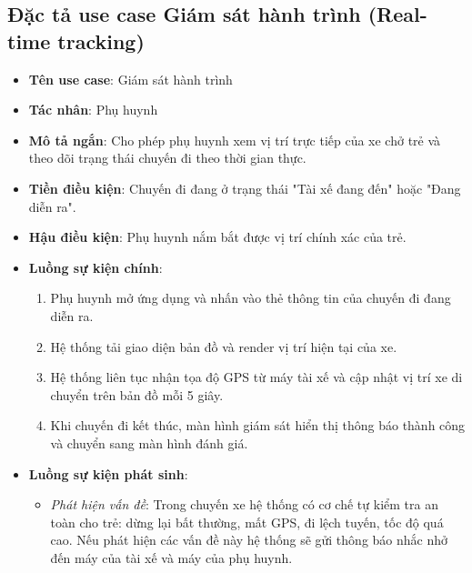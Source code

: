 \documentclass[../DoAn.tex]{subfiles}
\begin{document}
\subsection{Đặc tả use case Giám sát hành trình (Real-time tracking)}
\begin{itemize}
    \item \textbf{Tên use case}: Giám sát hành trình
    \item \textbf{Tác nhân}: Phụ huynh
    \item \textbf{Mô tả ngắn}: Cho phép phụ huynh xem vị trí trực tiếp của xe chở trẻ và theo dõi trạng thái chuyến đi theo thời gian thực.
    \item \textbf{Tiền điều kiện}: Chuyến đi đang ở trạng thái "Tài xế đang đến" hoặc "Đang diễn ra".
    \item \textbf{Hậu điều kiện}: Phụ huynh nắm bắt được vị trí chính xác của trẻ.
    \item \textbf{Luồng sự kiện chính}:
          \begin{enumerate}
              \item Phụ huynh mở ứng dụng và nhấn vào thẻ thông tin của chuyến đi đang diễn ra.
              \item Hệ thống tải giao diện bản đồ và render vị trí hiện tại của xe.
              \item Hệ thống liên tục nhận tọa độ GPS từ máy tài xế và cập nhật vị trí xe di chuyển trên bản đồ mỗi 5 giây.
              \item Khi chuyến đi kết thúc, màn hình giám sát hiển thị thông báo thành công và chuyển sang màn hình đánh giá.
          \end{enumerate}
    \item \textbf{Luồng sự kiện phát sinh}:
          \begin{itemize}
              \item \textit{Phát hiện vấn đề}: Trong chuyến xe hệ thống có cơ chế tự kiểm tra an toàn cho trẻ: dừng lại bất thường, mất GPS, đi lệch tuyến, tốc độ quá cao. Nếu phát hiện các vấn đề này hệ thống sẽ gửi thông báo nhắc nhở đến máy của tài xế và máy của phụ huynh.
          \end{itemize}
\end{itemize}
\end{document}
